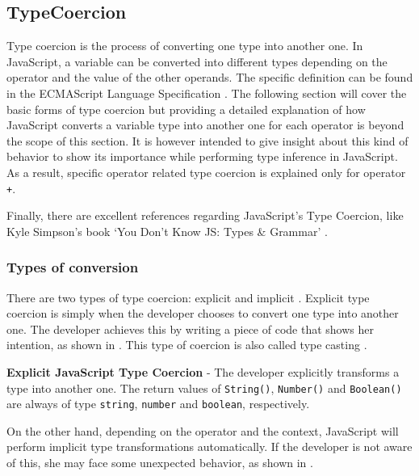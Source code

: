 \subsection{TypeCoercion} \label{sec:background-js-type-coercion}
Type coercion is the process of converting one type into another one. In JavaScript, a variable can be converted into different types depending on the operator and the value of the other operands. The specific definition can be found in the ECMAScript Language Specification \citep{ecma-script}. The following section will cover the basic forms of type coercion but providing a detailed explanation of how JavaScript converts a variable type into another one for each operator is beyond the scope of this section. It is however intended to give insight about this kind of behavior to show its importance while performing type inference in JavaScript. As a result, specific operator related type coercion is explained only for operator \texttt{+}.

Finally, there are excellent references regarding JavaScript's Type Coercion, like Kyle Simpson's book `You Don't Know JS: Types \& Grammar' \citep{you-dont-know-js}.

\subsubsection{Types of conversion}
\label{types_of_conversion}
There are two types of type coercion: explicit and implicit \citep{you-dont-know-js}. Explicit type coercion is simply when the developer chooses to convert one type into another one. The developer achieves this by writing a piece of code that shows her intention, as shown in . This type of coercion is also called type casting \citep{you-dont-know-js}.

\begin{code}
	\captionsetup{aboveskip=0pt, belowskip=10pt}
	\caption[Explicit JavaScript Type Coercion]{\textbf{Explicit JavaScript Type Coercion} - The developer explicitly transforms a type into another one. The return values of \texttt{String()}, \texttt{Number()} and \texttt{Boolean()} are always of type \texttt{string}, \texttt{number} and \texttt{boolean}, respectively.}
	\label{code:background-explicit-type-coercion}
  \end{code}

On the other hand, depending on the operator and the context, JavaScript will perform implicit type transformations automatically. If the developer is not aware of this, she may face some unexpected behavior, as shown in .

